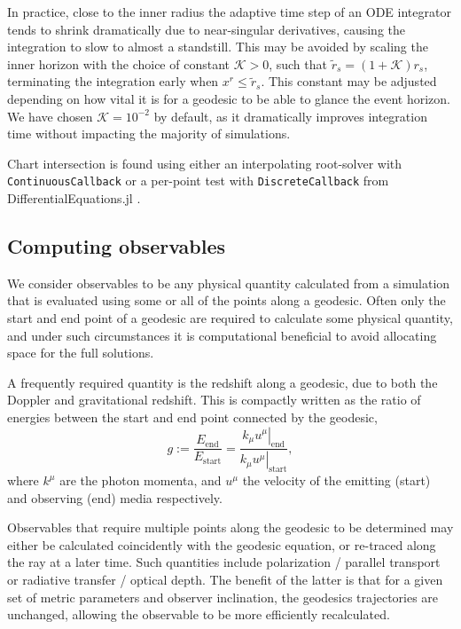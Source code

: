 In practice, close to the inner radius the adaptive time step of an ODE integrator tends to shrink dramatically due to near-singular derivatives, causing the integration to slow to almost a standstill. This may be avoided by scaling the inner horizon with the choice of constant $\mathcal{K} > 0$, such that $\tilde{r}_s = (1 + \mathcal{K}) r_s$, terminating the integration early when $x^r \leq \tilde{r}_s$. This constant may be adjusted depending on how vital it is for a geodesic to be able to glance the event horizon. We have chosen $\mathcal{K} = 10^{-2}$ by default, as it dramatically improves integration time without impacting the majority of simulations. 

Chart intersection is found using either an interpolating root-solver with \texttt{ContinuousCallback} or a per-point test with \texttt{DiscreteCallback} from DifferentialEquations.jl \citep{}.


\subsection{Computing observables}

We consider observables to be any physical quantity calculated from a simulation that is evaluated using some or all of the points along a geodesic. Often only the start and end point of a geodesic are required to calculate some physical quantity, and under such circumstances it is computational beneficial to avoid allocating space for the full solutions.

A frequently required quantity is the redshift along a geodesic, due to both the Doppler and gravitational redshift. This is compactly written as the ratio of energies between the start and end point connected by the geodesic,
\begin{equation}
g := \frac{E_\text{end}}{E_\text{start}} = \frac{\left. k_\mu u^\mu \right\rvert_\text{end}}{\left. k_\mu u^\mu \right\rvert_{\text{start}}},
\end{equation}
where $k^\mu$ are the photon momenta, and $u^\mu$ the velocity of the emitting (start) and observing (end) media respectively.

Observables that require multiple points along the geodesic to be determined may either be calculated coincidently with the geodesic equation, or re-traced along the ray at a later time. Such quantities include polarization / parallel transport or radiative transfer / optical depth. The benefit of the latter is that for a given set of metric parameters and observer inclination, the geodesics trajectories are unchanged, allowing the observable to be more efficiently recalculated.

